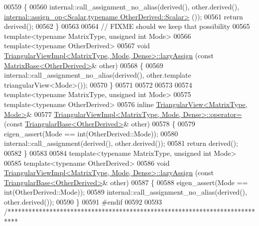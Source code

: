 \begin{DoxyCode}
00559 \{
00560   internal::call\_assignment\_no\_alias(derived(), other.derived(), 
      \hyperlink{struct_eigen_1_1internal_1_1assign__op}{internal::assign\_op<Scalar,typename OtherDerived::Scalar>}
      ());
00561   \textcolor{keywordflow}{return} derived();
00562 \}
00563 
00564 \textcolor{comment}{// FIXME should we keep that possibility}
00565 \textcolor{keyword}{template}<\textcolor{keyword}{typename} MatrixType, \textcolor{keywordtype}{unsigned} \textcolor{keywordtype}{int} Mode>
00566 \textcolor{keyword}{template}<\textcolor{keyword}{typename} OtherDerived>
00567 \textcolor{keywordtype}{void} \hyperlink{class_eigen_1_1_triangular_view_impl}{TriangularViewImpl<MatrixType, Mode, Dense>::lazyAssign}
      (\textcolor{keyword}{const} \hyperlink{group___core___module_class_eigen_1_1_matrix_base}{MatrixBase<OtherDerived>}& other)
00568 \{
00569   internal::call\_assignment\_no\_alias(derived(), other.template triangularView<Mode>());
00570 \}
00571 
00572 
00573 
00574 \textcolor{keyword}{template}<\textcolor{keyword}{typename} MatrixType, \textcolor{keywordtype}{unsigned} \textcolor{keywordtype}{int} Mode>
00575 \textcolor{keyword}{template}<\textcolor{keyword}{typename} OtherDerived>
00576 \textcolor{keyword}{inline} \hyperlink{group___core___module_class_eigen_1_1_triangular_view}{TriangularView<MatrixType, Mode>}&
00577 \hyperlink{class_eigen_1_1_triangular_view_impl}{TriangularViewImpl<MatrixType, Mode, Dense>::operator=}
      (\textcolor{keyword}{const} \hyperlink{group___core___module_class_eigen_1_1_triangular_base}{TriangularBase<OtherDerived>}& other)
00578 \{
00579   eigen\_assert(Mode == \textcolor{keywordtype}{int}(OtherDerived::Mode));
00580   internal::call\_assignment(derived(), other.derived());
00581   \textcolor{keywordflow}{return} derived();
00582 \}
00583 
00584 \textcolor{keyword}{template}<\textcolor{keyword}{typename} MatrixType, \textcolor{keywordtype}{unsigned} \textcolor{keywordtype}{int} Mode>
00585 \textcolor{keyword}{template}<\textcolor{keyword}{typename} OtherDerived>
00586 \textcolor{keywordtype}{void} \hyperlink{class_eigen_1_1_triangular_view_impl}{TriangularViewImpl<MatrixType, Mode, Dense>::lazyAssign}
      (\textcolor{keyword}{const} \hyperlink{group___core___module_class_eigen_1_1_triangular_base}{TriangularBase<OtherDerived>}& other)
00587 \{
00588   eigen\_assert(Mode == \textcolor{keywordtype}{int}(OtherDerived::Mode));
00589   internal::call\_assignment\_no\_alias(derived(), other.derived());
00590 \}
00591 \textcolor{preprocessor}{#endif}
00592 
00593 \textcolor{comment}{/***************************************************************************}

\end{DoxyCode}
